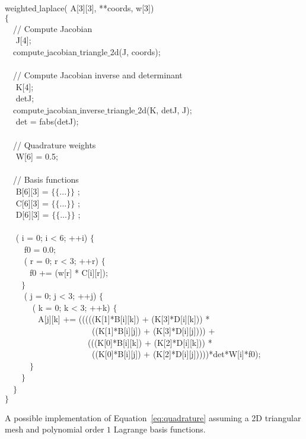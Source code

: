\begin{algorithm}
\scriptsize\ttfamily
{}

 weighted$\_$laplace( A[3][3],  **coords,  w[3]) \\
$\lbrace$ \\
~~// Compute Jacobian \\
~~ J[4]; \\
~~compute$\_$jacobian$\_$triangle$\_$2d(J, coords); \\
~~\\
~~// Compute Jacobian inverse and determinant \\
~~ K[4]; \\
~~ detJ; \\
~~compute$\_$jacobian$\_$inverse$\_$triangle$\_$2d(K, detJ, J); \\
~~ det = fabs(detJ); \\
~~\\
~~// Quadrature weights \\
~~ W[6] = {0.5}; \\
~~\\
~~// Basis functions \\
~~ B[6][3] = $\lbrace\lbrace$...$\rbrace\rbrace$ ;\\
~~ C[6][3] = $\lbrace\lbrace$...$\rbrace\rbrace$ ;\\
~~ D[6][3] = $\lbrace\lbrace$...$\rbrace\rbrace$ ;\\
~~\\
~~ ( i = 0; i < 6; ++i) $\lbrace$ \\
~~~~ f0  = 0.0;\\
~~~~ ( r  = 0; r < 3; ++r) $\lbrace$ \\
~~~~~~f0 += (w[r] * C[i][r]);\\
~~~~$\rbrace$ \\
~~~~ ( j = 0; j < 3; ++j) $\lbrace$\\
~~~~~~ ( k = 0; k < 3; ++k) $\lbrace$\\
~~~~~~~~A[j][k] += (((((K[1]*B[i][k]) + (K[3]*D[i][k])) * \\
~~~~~~~~~~~~~~~~~~~~~((K[1]*B[i][j]) + (K[3]*D[i][j]))) + \\
~~~~~~~~~~~~~~~~~~~~(((K[0]*B[i][k]) + (K[2]*D[i][k])) * \\
~~~~~~~~~~~~~~~~~~~~~((K[0]*B[i][j]) + (K[2]*D[i][j]))))*det*W[i]*f0);\\
~~~~~~$\rbrace$\\
~~~~$\rbrace$\\
~~$\rbrace$\\
$\rbrace$
\caption{A possible implementation of Equation~\ref{eq:quadrature} assuming a 2D triangular mesh and polynomial order $1$ Lagrange basis functions.}
\label{code:weighted-laplace}
\end{algorithm}

